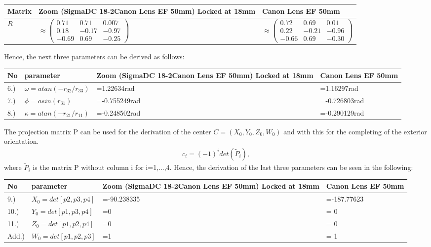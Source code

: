 \documentclass[a4paper,headings=small]{scrartcl}
\numberwithin{equation}{section} %
\numberwithin{figure}{section}   %
\begin{document}
\begin{tabular}{ l || p{6cm} || p{6cm}}
      Matrix & Zoom (SigmaDC 18-2Canon Lens EF 50mm) Locked at 18mm & Canon Lens EF 50mm \\
      \hline
      $R$ & $\approx
\left( \begin{array}{cccc}
 0.71 &  0.71 &  0.007 \\
 0.18 & -0.17 & -0.97 \\
-0.69  &  0.69 & -0.25
\end{array} \right)$  &  
$\approx
\left( \begin{array}{cccc}
 0.72 &  0.69 &  0.01 \\
 0.22 & -0.21 & -0.96  \\
-0.66 &  0.69 & -0.30
\end{array} \right)$  \\
\end{tabular}

Hence, the next three parameters can be derived as follows:

\begin{tabular}{ l l || p{6cm} || p{6cm}}
      No & parameter & Zoom (SigmaDC 18-2Canon Lens EF 50mm) Locked at 18mm & Canon Lens EF 50mm \\
      \hline
      6.) & $\omega=atan(-r_{32}/r_{33})$ & =1.22634rad &  =1.16297rad \\
      7.) & $\phi=asin(r_{31})$ & =-0.755249rad &  =-0.726803rad  \\
      8.) & $\kappa=atan(-r_{21}/r_{11})$ & =-0.248502rad & =-0.290129rad
\end{tabular}

The projection matrix P can be used for the derivation of the center $C=(X_0,Y_0,Z_0,W_0)$
and with this for the completing of the exterior orientation.
\begin{align}
c_i=(-1)^i det(\tilde{P}_i), 
\end{align}
where $\tilde{P}_i$ is the matrix P without column i for i=1,...,4.
Hence, the derivation of the last three parameters can be seen in the following:

\begin{tabular}{ l l || p{6cm} || p{6cm}}
      No & parameter & Zoom (SigmaDC 18-2Canon Lens EF 50mm) Locked at 18mm & Canon Lens EF 50mm \\
      \hline
      9.) & $X_0=det[p2,p3,p4]$ & =-90.238335 &  =-187.77623 \\
      10.) & $Y_0=det[p1,p3,p4]$ & =0 & =   0       \\
      11.) & $Z_0=det[p1,p2,p4]$ & =0 & =   0       \\
      Add.) & $W_0=det[p1,p2,p3]$ & =1 &=   1
\end{tabular}
\end{document}
